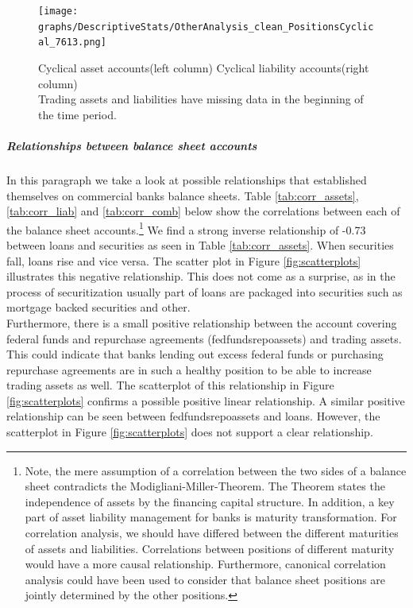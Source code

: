 \documentclass[12pt, a4paper]{article} %
\begin{document}
\begin{figure}[H]
\begin{minipage}{\textwidth}
\texttt{[image: graphs/DescriptiveStats/OtherAnalysis\_clean\_PositionsCyclical\_7613.png]}
\caption[1]{Cyclical asset accounts(left column) \hspace{2cm} Cyclical liability accounts(right column)\\
 Trading assets and liabilities have missing data in the beginning of the time period.}
\label{fig:positions}
\end{minipage}
\end{figure}

\subparagraph{Relationships between balance sheet accounts}
In this paragraph we take a look at possible relationships that established themselves on commercial banks balance sheets.
Table \ref{tab:corr_assets}, \ref{tab:corr_liab} and \ref{tab:corr_comb} below show the correlations between each of the balance sheet accounts.\footnote{Note, the mere assumption of a correlation between the two sides of a balance sheet contradicts the Modigliani-Miller-Theorem. The Theorem states the independence of assets by the financing capital structure. In addition, a key part of asset liability management for banks is maturity transformation. For correlation analysis, we should have differed between the different maturities of assets and liabilities. Correlations between positions of different maturity would have a more causal relationship. Furthermore, canonical correlation analysis could have been used to consider that balance sheet positions are jointly determined by the other positions.}
We find a strong inverse relationship of -0.73 between loans and securities as seen in Table \ref{tab:corr_assets}. When securities fall, loans rise and vice versa. The scatter plot in Figure \ref{fig:scatterplots} illustrates this negative relationship. This does not come as a surprise, as in the process of securitization usually part of loans are packaged into securities such as mortgage backed securities and other.\\
Furthermore, there is a small positive relationship between the account covering federal funds and repurchase agreements (fedfundsrepoassets) and trading assets. This could indicate that banks lending out excess federal funds or purchasing repurchase agreements are in such a healthy position to be able to increase trading assets as well. The scatterplot of this relationship in Figure \ref{fig:scatterplots} confirms a possible positive linear relationship. A similar positive relationship can be seen between fedfundsrepoassets and loans. However, the scatterplot in Figure \ref{fig:scatterplots} does not support a clear relationship.\\
\end{document}
